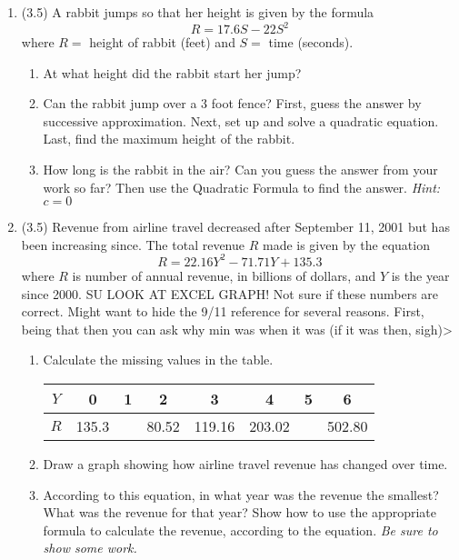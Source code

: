\documentclass[12pt]{article}
\begin{document}
\begin{enumerate}
\item (3.5) A rabbit jumps so that her height is given by the formula $$R = 17.6S - 22S^2$$ where $R=$ height of rabbit (feet) and $S=$ time (seconds).
\begin{enumerate}
\item At what height did the rabbit start her jump?
\item Can the rabbit jump over a 3 foot fence?  First,  guess the answer by successive approximation.  Next, set up and solve a quadratic equation.  Last, find the maximum height of the rabbit.
\item How long is the rabbit in the air?  Can you guess the answer from your work so far?  Then use the Quadratic Formula to find the answer.  \emph{Hint:  $c=0$}
\end{enumerate}

\item (3.5) Revenue from airline travel decreased after September 11, 2001 but has been increasing since.  The total revenue $R$ made is given by the equation $$R = 22.16Y^2-71.71Y+135.3$$
where $R$ is number of annual revenue, in billions of dollars, and $Y$ is the year since 2000.  SU LOOK AT EXCEL GRAPH!  Not sure if these numbers are correct.  Might want to hide the 9/11 reference for several reasons.  First, being that then you can ask why min was when it was (if it was then, sigh)>

\begin{enumerate}
\item Calculate the missing values in the table.
\begin{center}
\begin{tabular} {|c ||c |c |c |c |c |c |c |} \hline
$Y$ & 0   &1& 2 &3 &4&5 & 6  \\ \hline
$R$ &135.3 &  \quad ~& 80.52 & 119.16 & 203.02 &  \quad ~  & 502.80  \\  \hline
\end{tabular}
\end{center}
\item Draw a graph showing how airline travel revenue has changed over time.
\item According to this equation, in what year was the revenue the smallest?  What was the revenue for that year?  Show how to use the appropriate formula to calculate the revenue, according to the equation.  \emph{Be sure to show some work.}
\end{enumerate}





\end{enumerate}
\end{document}
